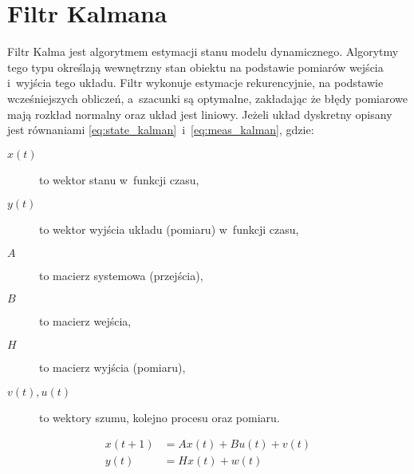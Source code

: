 \section{Filtr Kalmana}
Filtr Kalma jest algorytmem estymacji stanu modelu dynamicznego.
Algorytmy tego typu określają wewnętrzny stan obiektu na podstawie pomiarów
wejścia i~wyjścia tego układu.
Filtr wykonuje estymacje rekurencyjnie, na podstawie wcześniejszych obliczeń,
a~szacunki są optymalne, zakładając że błędy pomiarowe mają rozkład
normalny oraz układ jest liniowy.
Jeżeli układ dyskretny opisany jest równaniami
\ref{eq:state_kalman}~i~\ref{eq:meas_kalman}, gdzie:
\begin{description}
	\item[$x\left(t\right)$] to wektor stanu w~funkcji czasu,
	\item[$y\left(t\right)$] to wektor wyjścia układu (pomiaru) w~funkcji czasu,
	\item[$A$] to macierz systemowa (przejścia),
	\item[$B$] to macierz wejścia,
	\item[$H$] to macierz wyjścia (pomiaru),
	\item[$v\left(t\right), u\left(t\right)$] to wektory szumu, kolejno
		procesu oraz pomiaru.	
\end{description}
\begin{align}
x\left(t + 1\right) &= Ax\left(t\right) + Bu\left(t\right) + v\left(t\right)
\label{eq:state_kalman} \\
y\left(t\right) &= Hx\left(t\right) + w\left(t\right)
\label{eq:meas_kalman}
\end{align}

